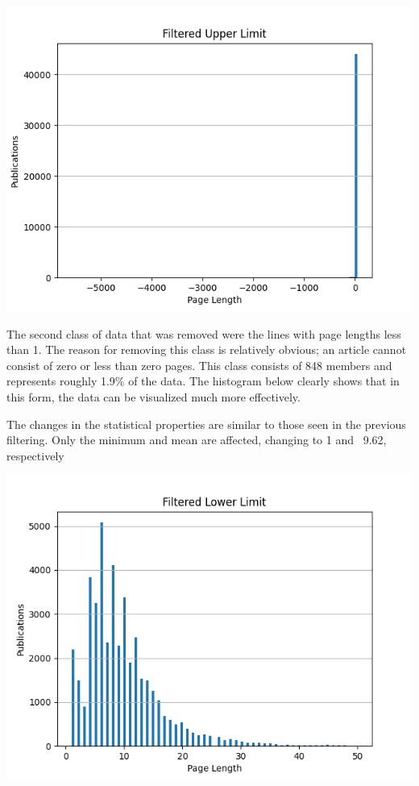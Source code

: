 \documentclass[11pt,a4paper,parskip=half ]{scrartcl}
\begin{document}
\includegraphics[width=\textwidth]{task02hist02.png}

The second class of data that was removed were the lines with page lengths less than 1. The reason for removing this class is relatively obvious; an article cannot consist of zero or less than zero pages. This class consists of 848 members and represents roughly 1.9\% of the data. The histogram below clearly shows that in this form, the data can be visualized much more effectively.

The changes in the statistical properties are similar to those seen in the previous filtering. Only the minimum and mean are affected, changing to 1 and ~9.62, respectively
	
\includegraphics[width=\textwidth]{task02hist03.png}
	
	
\end{document}
